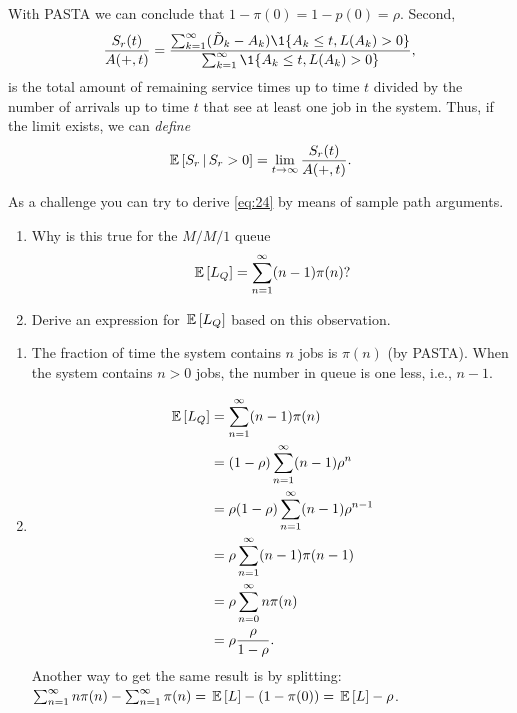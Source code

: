 \begin{question}
\begin{solution}
With PASTA we can conclude that $1-\pi(0) = 1-p(0)= \rho$. Second,
\begin{equation*}
\frac{S_r(t)}{A(+,t)} 
= \frac{\sum_{k=1}^\infty (\tilde D_k - A_k) \1{A_k\leq t, L(A_k) > 0}}{\sum_{k=1}^\infty \1{A_k\leq t, L(A_k)>0}},
\end{equation*}
is the total amount of remaining service times up to time $t$ divided by
the number of arrivals up to time $t$ that see at least one job in the system. Thus, 
if the limit exists, we can \emph{define}
\begin{equation*}
\,\mathbb{E}\left[S_r \,\middle|\, S_r>0\right]  =\lim_{t\to\infty} \frac{S_r(t)}{A(+,t)}.
\end{equation*}
  \end{solution}
\end{question}

\begin{question}[use=false]
  As a challenge you can try to derive \eqref{eq:24} by means of sample path arguments.
  \begin{solution}
    \TBD
  \end{solution}
\end{question}



\begin{question}
  \begin{enumerate}
  \item Why is this true for the $M/M/1$ queue
  \begin{equation*}
\,\mathbb{E}\left[L_Q\right] = \sum_{n=1}^\infty (n-1)\pi(n)?
  \end{equation*}
\item   Derive an expression for $\,\mathbb{E}\left[L_Q\right]$ based on this observation.
  \end{enumerate}
  \begin{solution}
    \begin{enumerate}
    \item 
    The fraction of time the system contains $n$ jobs is $\pi(n)$ (by
    PASTA). When the system contains $n>0$ jobs, the number in queue
    is one less, i.e., $n-1$.
  \item 
    \begin{equation*}
      \begin{split}
\,\mathbb{E}\left[L_Q\right] 
&= \sum_{n=1}^\infty (n-1)\pi(n) \\
&= (1-\rho)\sum_{n=1}^\infty (n-1) \rho^n\\
&= \rho (1-\rho)\sum_{n=1}^\infty (n-1) \rho^{n-1}\\
&= \rho \sum_{n=1}^\infty (n-1) \pi(n-1)\\
&= \rho \sum_{n=0}^\infty n \pi(n)\\
&= \rho \frac{\rho}{1-\rho}.
      \end{split}
    \end{equation*}
Another way to get the same result is by splitting: $\sum_{n=1}^\infty n\pi(n) -\sum_{n=1}^\infty \pi(n) = 
\,\mathbb{E}\left[L\right] - (1-\pi(0)) = \,\mathbb{E}\left[L\right] - \rho$. 
    \end{enumerate}
  \end{solution}
\end{question}

